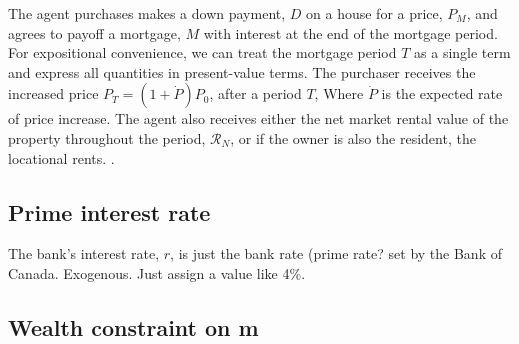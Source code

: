 

    
 The agent purchases makes a down payment, $D$ on a house for a price, $P_M$, and agrees to payoff a mortgage, $M$ with interest at the end of the mortgage period. For expositional convenience, we can treat the mortgage period $T$ as a single term and express all quantities  in present-value terms. The purchaser 
 receives the increased price $P_T = (1 + \dot P)P_0$,  after a period $T$, Where $\dot P$ is the expected rate of price increase. The agent also receives either the net market rental value of the property throughout the period, $\mathcal{R}_N$, or if the owner is also the resident, the locational rents.
\cite{anselinModernSpatialEconometrics2014, gelmanDataAnalysisUsing2006}.

\subsection{Prime interest rate}\label{section-bank-rate}

The bank's interest rate, $r$, is just the bank rate (prime rate? set by the Bank of Canada. Exogenous. Just assign  a value like 4\%.

\subsection{Wealth constraint on m} \label{section-wealth-constraint}

